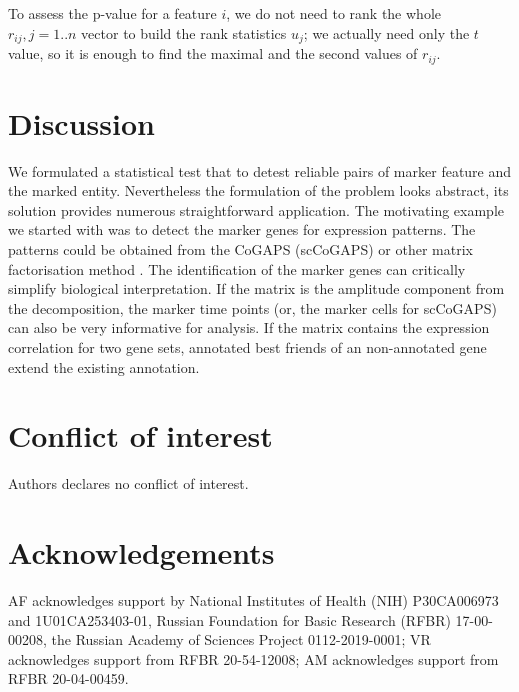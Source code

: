 \documentclass{llncs}
\begin{document}
To assess the p-value for a feature $i$, we do not need to rank the whole $r_{ij}, j=1..n$ vector to build the rank statistics $u_j$; we actually need only the $t$ value, so it is enough to find the maximal and the second values of $r_{ij}$.

\section{Discussion}

We formulated a statistical test that to detest reliable pairs of marker feature and the marked entity. Nevertheless the formulation of the problem looks abstract, its solution provides numerous straightforward application. The motivating example we started with was to detect the marker genes for expression patterns. The patterns could be obtained from the CoGAPS (scCoGAPS) \cite{Fertig_2016} or other matrix factorisation method \cite{Stein_2018}. The identification of the marker genes can critically simplify biological interpretation. If the matrix is the amplitude component from  the decomposition, the marker time points (or, the marker cells for scCoGAPS) can also be very informative for analysis. If the matrix contains the expression correlation for two gene sets, annotated best friends of an non-annotated gene extend the existing annotation.

\section{Conflict of interest}
Authors declares no conflict of interest.

\section{Acknowledgements}
AF acknowledges support by National Institutes of Health (NIH) P30CA006973 and 1U01CA253403-01, Russian Foundation for Basic Research (RFBR) 17-00-00208, the Russian Academy of Sciences Project 0112-2019-0001; VR acknowledges support from RFBR 20-54-12008; AM acknowledges support from RFBR 20-04-00459.





\newcommand{\beginsupplement}{%
        \setcounter{table}{0}
        \renewcommand{\thetable}{S\arabic{table}}%
        \setcounter{figure}{0}
        \renewcommand{\thefigure}{S\arabic{figure}}
        \setcounter{equation}{0}
        \renewcommand{\theequation}{S\arabic{equation}}%
     }
\end{document}
